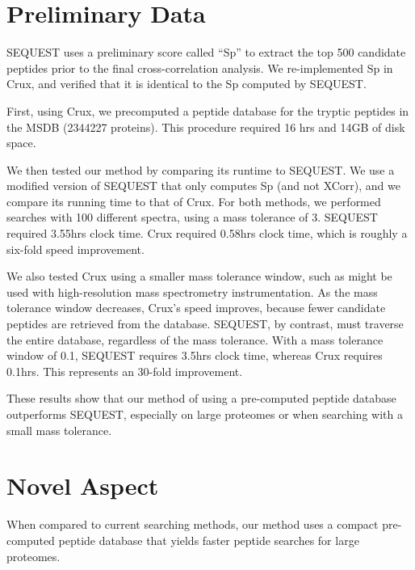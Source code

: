 \documentclass[12pt]{article}
\begin{document}
\section{Preliminary Data}



SEQUEST uses a preliminary score called ``Sp'' to extract the top 500
candidate peptides prior to the final cross-correlation analysis.
We re-implemented Sp in Crux, and verified that it is identical to the
Sp computed by SEQUEST.

First, using Crux, we precomputed a peptide database for the tryptic
peptides in the MSDB (2344227 proteins).  This procedure required 16
hrs and 14GB of disk space.

We then tested our method by comparing its runtime to SEQUEST.  We use
a modified version of SEQUEST that only computes Sp (and not XCorr),
and we compare its running time to that of Crux.  For both methods, we
performed searches with 100 different spectra, using a mass tolerance
of 3.  SEQUEST required 3.55hrs clock time. Crux required 0.58hrs clock time, 
which is roughly a six-fold speed improvement.

We also tested Crux using a smaller mass tolerance window, such
as might be used with high-resolution mass spectrometry
instrumentation.  As the mass tolerance window decreases, Crux's speed
improves, because fewer candidate peptides are retrieved from the
database.  SEQUEST, by contrast, must traverse the entire database,
regardless of the mass tolerance.  With a mass tolerance window of
0.1, SEQUEST requires 3.5hrs clock time, whereas Crux requires 
0.1hrs.  This represents an 30-fold improvement.

These results show that our method of using a pre-computed peptide
database outperforms SEQUEST, especially on large proteomes or when
searching with a small mass tolerance.

\section{Novel Aspect}

When compared to current searching methods, our method uses a compact
pre-computed peptide database that yields faster peptide searches for
large proteomes.
\end{document}
